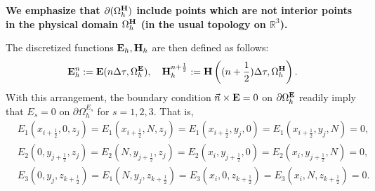 \documentclass[12pt,reqno]{amsart}
\newcommand{\R}{\mathbb{R}}
\newcommand{\e}{{\bf E}}
\newcommand{\h}{{\bf H}}
\theoremstyle{definition}
\numberwithin{equation}{section}
\def\Gwh{\Omega_h}
\begin{document}
{\bf We emphasize that $\partial(\Gwh^\h)$ include points which are not interior points
	 in the physical domain $\Gwh^\h$	 (in the usual topology on $\R^3$). }



    The discretized functions $\e_h, \h_h$ are then defined as follows:
    $$
    \e_h^n:=\e(n\Delta \tau,\Gwh^\e),\quad  \h_h^{n+\frac{1}{2}}:=\h\left ((n+\frac{1}{2})\Delta \tau,\Gwh^\h\right).
    $$
	With this arrangement, the boundary condition 
	$\vec{n}\times {\bf E}=0$ on $\partial \Gwh^{{\bf E}}$ readily imply that 
	$E_s=0$ on $\partial \Gwh^{E_s}$ for $s=1,2,3$. That is, 
	\begin{align*}
		&
		E_1(x_{i+\frac{1}{2}},0,z_j)=E_1(x_{i+\frac{1}{2}},N,z_j)=
		E_1(x_{i+\frac{1}{2}},y_j,0)=E_1(x_{i+\frac{1}{2}},y_j, N)=0, \\&
		E_2(0,y_{j+\frac{1}{2}},z_j)=E_2(N,y_{j+\frac{1}{2}},z_j)=
		E_2(x_i,y_{j+\frac{1}{2}},0)=E_2(x_i, y_{j+\frac{1}{2}}, N)=0, \\&
		E_3(0,y_j,z_{k+\frac{1}{2}})=E_1(N,y_j,z_{k+\frac{1}{2}})=
		E_3(x_i,0,z_{k+\frac{1}{2}})=E_3(x_i,N,z_{k+\frac{1}{2}})=0. &
	\end{align*} 
\end{document}
